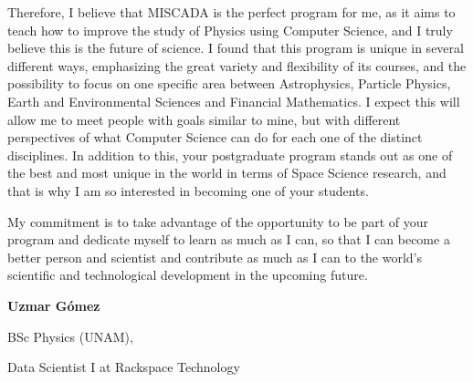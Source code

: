 \documentclass{article}
\begin{document}
Therefore, I believe that MISCADA is the perfect program for me, as it aims to teach how to improve the study of Physics using Computer Science, and I truly believe this is the future of science. I found that this program is unique in several different ways, emphasizing the great variety and flexibility of its courses, and the possibility to focus on one specific area between Astrophysics, Particle Physics, Earth and Environmental Sciences and Financial Mathematics. I expect this will allow me to meet people with goals similar to mine, but with different perspectives of what Computer Science can do for each one of the distinct disciplines. In addition to this, your postgraduate program stands out as one of the best and most unique in the world in terms of Space Science research, and that is why I am so interested in becoming one of your students.

My commitment is to take advantage of the opportunity to be part of your program and dedicate myself to learn as much as I can, so that I can become a better person and scientist and contribute as much as I can to the world’s scientific and technological development in the upcoming future.

\vspace{2cm}
\hfill \textbf{Uzmar Gómez}

\hfill BSc Physics (UNAM), 

\hfill Data Scientist I at Rackspace Technology
\end{document}
